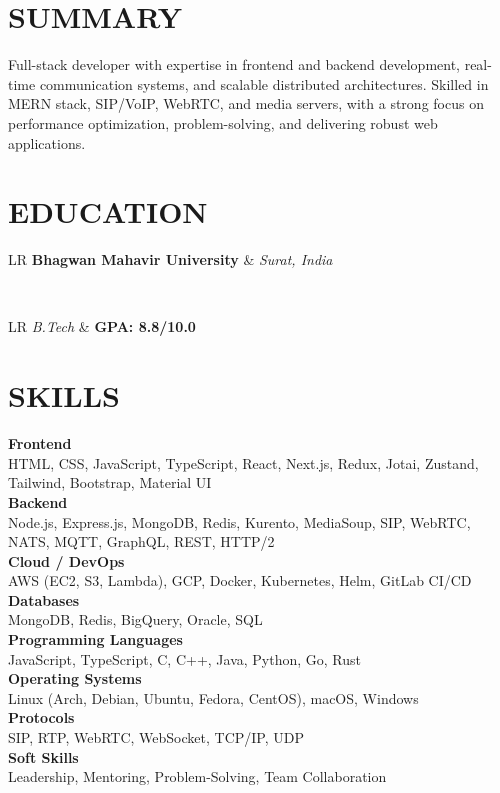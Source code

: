 \documentclass[11pt,a4paper]{moderncv}
\newcommand*{\educationentry}[5][0.5mm]{%
    \begin{tabularx}{\textwidth}{LR}
        {\bfseries #3} & {\itshape #4} \\
    \end{tabularx} \\ [4pt]
    \begin{tabularx}{\textwidth}{LR}
        {\itshape #2} & {\bfseries #5} \\
    \end{tabularx}
    \par\addvspace{#1}
}
\begin{document}
\begin{minipage}[t]{0.35\textwidth}
\section{SUMMARY}
Full-stack developer with expertise in frontend and backend development, real-time communication systems, and scalable distributed architectures. Skilled in MERN stack, SIP/VoIP, WebRTC, and media servers, with a strong focus on performance optimization, problem-solving, and delivering robust web applications.

\section{EDUCATION}
\educationentry{B.Tech}{Bhagwan Mahavir University}{Surat, India}{GPA: 8.8/10.0}
\par

\section{SKILLS}
\textbf{Frontend} \\
HTML, CSS, JavaScript, TypeScript, React, Next.js, Redux, Jotai, Zustand, Tailwind, Bootstrap, Material UI \\[6pt]
\textbf{Backend} \\
Node.js, Express.js, MongoDB, Redis, Kurento, MediaSoup, SIP, WebRTC, NATS, MQTT, GraphQL, REST, HTTP/2 \\[6pt]
\textbf{Cloud / DevOps} \\
AWS (EC2, S3, Lambda), GCP, Docker, Kubernetes, Helm, GitLab CI/CD \\[6pt]
\textbf{Databases} \\
MongoDB, Redis, BigQuery, Oracle, SQL \\[6pt]
\textbf{Programming Languages} \\
JavaScript, TypeScript, C, C++, Java, Python, Go, Rust \\[6pt]
\textbf{Operating Systems} \\
Linux (Arch, Debian, Ubuntu, Fedora, CentOS), macOS, Windows \\[6pt]
\textbf{Protocols} \\
SIP, RTP, WebRTC, WebSocket, TCP/IP, UDP \\[6pt]
\textbf{Soft Skills} \\
Leadership, Mentoring, Problem-Solving, Team Collaboration


\end{minipage}
\end{document}
